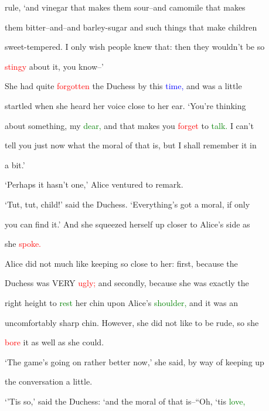  \textcolor{BurntOrange}{rule,} ‘and vinegar that makes them sour--and camomile that makes

 them bitter--and--and barley-sugar and such things that make \textcolor{BurntOrange}{children}

 sweet-tempered. I only wish people knew that: then they wouldn’t be so

 \textcolor{red}{stingy} about it, you know--’



 She had quite \textcolor{red}{forgotten} the Duchess by this \textcolor{blue}{time,} and was a little

 \textcolor{BurntOrange}{startled} when she heard her voice close to her ear. ‘You’re thinking

 about something, my \textcolor{green}{dear,} and that makes you \textcolor{red}{forget} to \textcolor{green}{talk.} I can’t

 tell you just now what the \textcolor{BurntOrange}{moral} of that is, but I shall remember it in

 a bit.’



 ‘Perhaps it hasn’t one,’ Alice ventured to remark.



 ‘Tut, tut, \textcolor{BurntOrange}{child!’} said the Duchess. ‘Everything’s got a \textcolor{BurntOrange}{moral,} if only

 you can find it.’ And she squeezed herself up closer to Alice’s side as

 she \textcolor{red}{spoke.}



 Alice did not much like keeping so close to her: first, because the

 Duchess was VERY \textcolor{red}{ugly;} and secondly, because she was exactly the

 right height to \textcolor{green}{rest} her chin upon Alice’s \textcolor{green}{shoulder,} and it was an

 uncomfortably sharp chin. However, she did not like to be rude, so she

 \textcolor{red}{bore} it as well as she could.



 ‘The game’s going on rather better now,’ she said, by way of keeping up

 the conversation a little.



 ‘’Tis so,’ said the Duchess: ‘and the \textcolor{BurntOrange}{moral} of that is--“Oh, ‘tis \textcolor{green}{love,}

